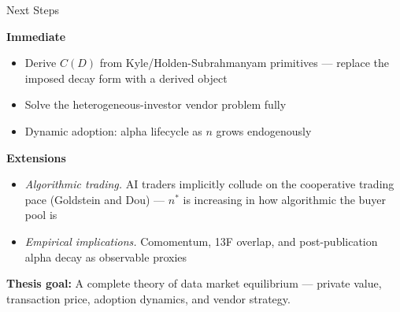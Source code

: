 \documentclass[12pt, aspectratio=169]{beamer}
\begin{document}
\begin{frame}{Next Steps}

\footnotesize
\textbf{Immediate}
\begin{itemize}\setlength\itemsep{1pt}
  \item Derive $C(D)$ from Kyle/Holden-Subrahmanyam primitives ---
        replace the imposed decay form with a derived object
  \item Solve the heterogeneous-investor vendor problem fully
  \item Dynamic adoption: alpha lifecycle as $n$ grows endogenously
\end{itemize}

\vspace{2pt}
\textbf{Extensions}
\begin{itemize}\setlength\itemsep{1pt}
  \item \textit{Algorithmic trading.} AI traders implicitly collude on the
        cooperative trading pace (Goldstein and Dou) --- $n^*$ is increasing
        in how algorithmic the buyer pool is
  \item \textit{Empirical implications.}
        Comomentum, 13F overlap, and post-publication alpha decay
        as observable proxies
\end{itemize}

\vspace{2pt}
\textbf{Thesis goal:} A complete theory of data market equilibrium ---
private value, transaction price, adoption dynamics, and vendor strategy.

\end{frame}
\end{document}
